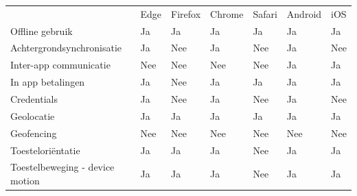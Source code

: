 	 	\begin{table}[]
	 			\centering
				\begin{tabular}{p{6cm}p{13mm}p{13mm}p{13mm}p{13mm}p{13mm}p{13mm}}
	 			
					& Edge & Firefox & Chrome & Safari& Android & iOS \\ 
				   
				   Offline gebruik & \cellcolor{green!40} Ja  & \cellcolor{green!40} Ja & \cellcolor{green!40} Ja  & \cellcolor{green!40} Ja & \cellcolor{green!40} Ja & \cellcolor{green!40} Ja \\
				   
				   Achtergrondsynchronisatie & \cellcolor{green!40} Ja  &  \cellcolor{red!50} Nee& \cellcolor{green!40} Ja  &  \cellcolor{red!50} Nee& \cellcolor{green!40} Ja & \cellcolor{red!50} Nee \\
				   
				   Inter-app communicatie & \cellcolor{red!50} Nee  &  \cellcolor{red!50} Nee& \cellcolor{red!50} Nee  &  \cellcolor{red!50} Nee& \cellcolor{green!40} Ja & \cellcolor{green!40} Ja \\
				   
				   In app betalingen & \cellcolor{green!40} Ja  &\cellcolor{red!50} Nee & \cellcolor{green!40} Ja  & \cellcolor{green!40} Ja & \cellcolor{green!40} Ja & \cellcolor{green!40} Ja \\
				   
				   Credentials & \cellcolor{green!40} Ja  & \cellcolor{red!50} Nee & \cellcolor{green!40} Ja  & \cellcolor{red!50} Nee & \cellcolor{green!40} Ja & \cellcolor{red!50} Nee \\
				   
				   Geolocatie & \cellcolor{green!40} Ja  & \cellcolor{green!40} Ja & \cellcolor{green!40} Ja  & \cellcolor{green!40} Ja & \cellcolor{green!40} Ja & \cellcolor{green!40} Ja \\
				   
				   Geofencing &  \cellcolor{red!50} Nee  &  \cellcolor{red!50} Nee &  \cellcolor{red!50} Nee  & \cellcolor{red!50} Nee &  \cellcolor{red!50} Nee &  \cellcolor{red!50} Nee \\
				   
				   Toesteloriëntatie & \cellcolor{green!40} Ja  & \cellcolor{green!40} Ja & \cellcolor{green!40} Ja  & \cellcolor{red!50} Nee& \cellcolor{green!40} Ja & \cellcolor{green!40} Ja \\
				   
				   Toestelbeweging - device motion & \cellcolor{green!40} Ja  & \cellcolor{green!40} Ja & \cellcolor{green!40} Ja  & \cellcolor{red!50} Nee& \cellcolor{green!40} Ja & \cellcolor{green!40} Ja \\
				   

\end{tabular}
\end{table}
